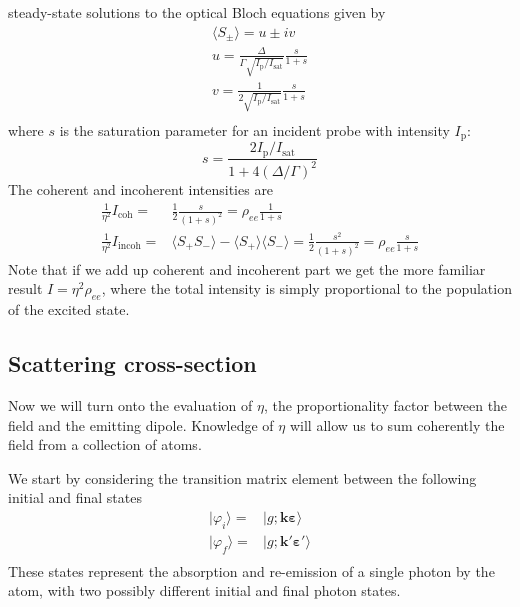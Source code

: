 \documentclass[11pt,letter]{article}
\newcommand{\bv}[1]{\ensuremath{\bm{#1}}}
\newcommand{\iisat}{\ensuremath{I_{\mathrm{p}}/I_{\mathrm{sat}}}}
\begin{document}
steady-state solutions to the optical Bloch equations given by
\begin{gather} 
    \langle S_{\pm} \rangle =  u \pm i v  \\
    u =  \frac{ \Delta }{ \Gamma  \sqrt{ I_{\mathrm{p}} / I_{\mathrm{sat}}} } 
         \frac{s}{ 1 + s } \\
    v =  \frac{ 1 } { 2 \sqrt{ I_{\mathrm{p}} / I_{\mathrm{sat}}} } 
         \frac{s}{1+s} \\
\end{gather}
where $s$ is the saturation parameter for an incident probe with intensity
$I_{\mathrm{p}}$:
\begin{equation}
s = \frac{ 2  \iisat } { 1 + 4(\Delta/\Gamma)^{2} } 
\end{equation}
The coherent and incoherent intensities are
\begin{equation}
\begin{split} 
    \frac{1}{\eta^{2}}  I_{\mathrm{coh}} = &
        \frac{1}{2} \frac{s}{(1+s)^{2} } 
      = \rho_{ee}  \frac{1}{1+s} \\
    \frac{1}{\eta^{2}}  I_{\mathrm{incoh}}  = & 
        \langle S_{+}S_{-} \rangle - \langle S_{+} \rangle \langle S_{-} \rangle
      = \frac{1}{2} \frac{s^{2}}{(1+s)^{2}} = \rho_{ee} \frac{s}{1+s}
 \label{eq:coh-incoh} 
\end{split}
\end{equation}
Note that if we add up coherent and incoherent part we get the more familiar result $I=\eta^{2} \rho_{ee}$, where the total intensity is simply proportional to the population of the excited state.


\subsection{Scattering cross-section}

Now we will turn onto the evaluation of $\eta$, the proportionality factor
between the field and the emitting dipole.  Knowledge of $\eta$ will allow us
to sum coherently the field from a collection of atoms. 

We start by considering the  transition matrix element between the following
initial and final states 
\begin{equation}
\begin{split}
    | \varphi_{i} \rangle = & | g ; \bv{k}\bv{\varepsilon} \rangle \\
    | \varphi_{f} \rangle = & | g ; \bv{k}'\bv{\varepsilon}' \rangle \\
\end{split}
\end{equation}
These states represent the absorption and re-emission of a single photon by the
atom, with two possibly different initial and final photon states.
 
\end{document}
